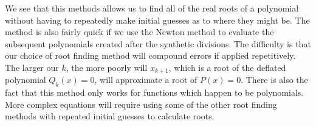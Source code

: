\documentclass[12pt, oneside]{article}
\begin{document}
We see that this methods allows us to find all of the real roots of a polynomial without having to repeatedly make initial guesses as to where they might be. The method is also fairly quick if we use the Newton method to evaluate the subsequent polynomials created after the synthetic divisions. The difficulty is that our choice of root finding method will compound errors if applied repetitively. The larger our $k$, the more poorly will $x_{k+1}$, which is a root of the deflated polynomial $Q_k(x) = 0$, will approximate a root of $P(x) = 0$. There is also the fact that this method only works for functions which happen to be polynomials. More complex equations will require using some of the other root finding methods with repeated initial guesses to calculate roots.
\end{document}
